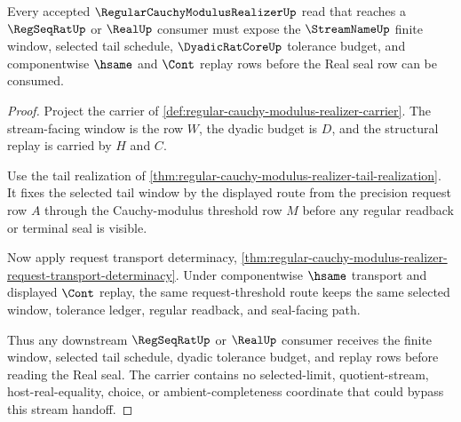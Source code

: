 \begin{theorem}
\label{thm:regular-cauchy-modulus-realizer-stream-handoff}
Every accepted $\RegularCauchyModulusRealizerUp$ read that reaches a $\RegSeqRatUp$ or $\RealUp$ consumer must expose the $\StreamNameUp$ finite window, selected tail schedule, $\DyadicRatCoreUp$ tolerance budget, and componentwise $\hsame$ and $\Cont$ replay rows before the Real seal row can be consumed.
\end{theorem}
\begin{proof}
Project the carrier of \autoref{def:regular-cauchy-modulus-realizer-carrier}. The stream-facing window is the row $W$, the dyadic budget is $D$, and the structural replay is carried by $H$ and $C$.

Use the tail realization of \autoref{thm:regular-cauchy-modulus-realizer-tail-realization}. It fixes the selected tail window by the displayed route from the precision request row $A$ through the Cauchy-modulus threshold row $M$ before any regular readback or terminal seal is visible.

Now apply request transport determinacy, \autoref{thm:regular-cauchy-modulus-realizer-request-transport-determinacy}. Under componentwise $\hsame$ transport and displayed $\Cont$ replay, the same request-threshold route keeps the same selected window, tolerance ledger, regular readback, and seal-facing path.

Thus any downstream $\RegSeqRatUp$ or $\RealUp$ consumer receives the finite window, selected tail schedule, dyadic tolerance budget, and replay rows before reading the Real seal. The carrier contains no selected-limit, quotient-stream, host-real-equality, choice, or ambient-completeness coordinate that could bypass this stream handoff.
\end{proof}

